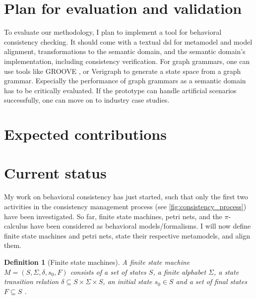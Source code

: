 \documentclass[conference]{IEEEtran}
\newtheorem{definition}{Definition}
\begin{document}
\section{Plan for evaluation and validation}
To evaluate our methodology, I plan to implement a tool for behavioral consistency checking.
It should come with a textual \gls{dsl} for metamodel and model alignment, transformations to the semantic domain, and the semantic domain's implementation, including consistency verification.
For graph grammars, one can use tools like GROOVE \cite{ghamarianModellingAnalysisUsing2012, rensinkGROOVESimulatorTool2004}, or Verigraph \cite{costaVerigraphSystemSpecification2016} to generate a state space from a graph grammar.
Especially the performance of graph grammars as a semantic domain has to be critically evaluated.
If the prototype can handle artificial scenarios successfully, one can move on to industry case studies.

\section{Expected contributions}
\section{Current status} \label{sec:currentStatus}
My work on behavioral consistency has just started, such that only the first two activities in the consistency management process (see \autoref{fig:consistency_process}) have been investigated.
So far, finite state machines, petri nets, and the $\pi$-calculus have been considered as behavioral models/formalisms.
I will now define finite state machines and petri nets, state their respective metamodels, and align them.

\begin{definition}[Finite state machines] \label{def:fsm}
    A finite state machine $M=(S, \Sigma, \delta, s_0, F)$ consists of a set of states $S$, a finite alphabet $\Sigma$, a state transition relation $\delta \subseteq S \times \Sigma \times S$, an initial state $s_0 \in S$ and a set of final states $F \subseteq S$ \cite{kunzeBehaviouralModelsModelling2016}. %
\end{definition}
\end{document}
